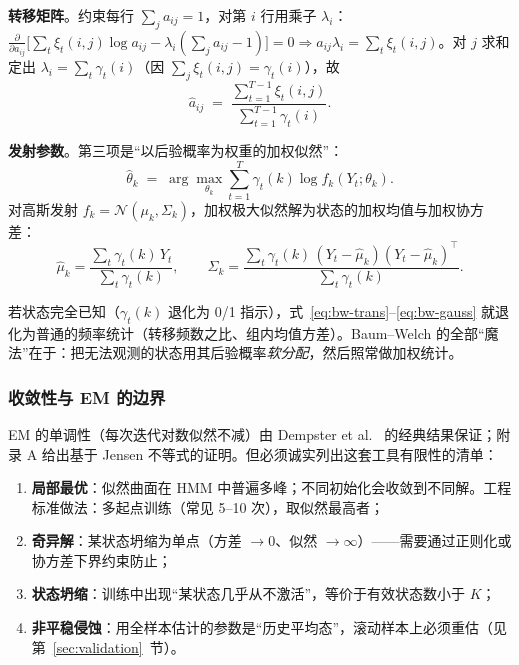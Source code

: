 \textbf{转移矩阵}。约束每行 $\sum_j a_{ij} = 1$，对第 $i$ 行用乘子 $\lambda_i$：
$\frac{\partial}{\partial a_{ij}}\big[\sum_t \xi_t(i,j)\log a_{ij} - \lambda_i(\sum_j a_{ij} - 1)\big] = 0
\Rightarrow a_{ij} \lambda_i = \sum_t \xi_t(i,j)$。对 $j$ 求和定出 $\lambda_i = \sum_{t}\gamma_t(i)$（因 $\sum_j \xi_t(i,j) = \gamma_t(i)$），故
\begin{equation}
\hat{a}_{ij} \;=\; \frac{\sum_{t=1}^{T-1} \xi_t(i,j)}{\sum_{t=1}^{T-1} \gamma_t(i)}.
\label{eq:bw-trans}
\end{equation}

\textbf{发射参数}。第三项是“以后验概率为权重的加权似然”：
\begin{equation}
\hat{\theta}_k \;=\; \arg\max_{\theta_k} \sum_{t=1}^{T} \gamma_t(k) \log f_k(Y_t; \theta_k).
\end{equation}
对高斯发射 $f_k = \mathcal{N}(\mu_k, \Sigma_k)$，加权极大似然解为状态的加权均值与加权协方差：
\begin{equation}
\hat{\mu}_k = \frac{\sum_t \gamma_t(k)\, Y_t}{\sum_t \gamma_t(k)},
\qquad
\hat{\Sigma}_k = \frac{\sum_t \gamma_t(k)\,(Y_t - \hat{\mu}_k)(Y_t - \hat{\mu}_k)^{\!\top}}{\sum_t \gamma_t(k)}.
\label{eq:bw-gauss}
\end{equation}

\begin{remark}
若状态完全已知（$\gamma_t(k)$ 退化为 0/1 指示），式~\eqref{eq:bw-trans}--\eqref{eq:bw-gauss} 就退化为普通的频率统计（转移频数之比、组内均值方差）。Baum--Welch 的全部“魔法”在于：把无法观测的状态用其后验概率\emph{软分配}，然后照常做加权统计。
\end{remark}

\subsubsection{收敛性与 EM 的边界}

EM 的单调性（每次迭代对数似然不减）由 Dempster et al.~\cite{dempster1977} 的经典结果保证；附录 A 给出基于 Jensen 不等式的证明。但必须诚实列出这套工具有限性的清单：

\begin{enumerate}[itemsep=2pt]
\item \textbf{局部最优}：似然曲面在 HMM 中普遍多峰；不同初始化会收敛到不同解。工程标准做法：多起点训练（常见 5--10 次），取似然最高者；
\item \textbf{奇异解}：某状态坍缩为单点（方差 $\to 0$、似然 $\to \infty$）——需要通过正则化或协方差下界约束防止；
\item \textbf{状态坍缩}：训练中出现“某状态几乎从不激活”，等价于有效状态数小于 $K$；
\item \textbf{非平稳侵蚀}：用全样本估计的参数是“历史平均态”，滚动样本上必须重估（见第~\ref{sec:validation}~节）。
\end{enumerate}

